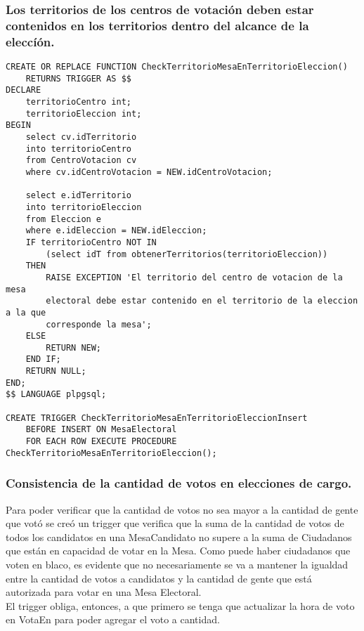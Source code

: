 \subsubsection{Los territorios de los centros de votación deben estar contenidos en los territorios dentro del alcance de la eleccíón.}

\begin{verbatim}
CREATE OR REPLACE FUNCTION CheckTerritorioMesaEnTerritorioEleccion() 
    RETURNS TRIGGER AS $$
DECLARE
    territorioCentro int;
    territorioEleccion int;
BEGIN
    select cv.idTerritorio 
    into territorioCentro 
    from CentroVotacion cv 
    where cv.idCentroVotacion = NEW.idCentroVotacion;
    
    select e.idTerritorio 
    into territorioEleccion 
    from Eleccion e 
    where e.idEleccion = NEW.idEleccion;
    IF territorioCentro NOT IN 
        (select idT from obtenerTerritorios(territorioEleccion))
    THEN
        RAISE EXCEPTION 'El territorio del centro de votacion de la mesa 
        electoral debe estar contenido en el territorio de la eleccion a la que 
        corresponde la mesa';
    ELSE
        RETURN NEW;
    END IF;
    RETURN NULL;
END;
$$ LANGUAGE plpgsql;

CREATE TRIGGER CheckTerritorioMesaEnTerritorioEleccionInsert
    BEFORE INSERT ON MesaElectoral
    FOR EACH ROW EXECUTE PROCEDURE CheckTerritorioMesaEnTerritorioEleccion();
\end{verbatim}

\subsubsection{Consistencia de la cantidad de votos en elecciones de cargo.}

\indent Para poder verificar que la cantidad de votos no sea mayor a la cantidad de gente que votó se creó un trigger que verifica que la suma de la cantidad de votos de todos los candidatos en una MesaCandidato no supere a la suma de Ciudadanos que están en capacidad de votar en la Mesa. Como puede haber ciudadanos que voten en blaco, es evidente que no necesariamente se va a mantener la igualdad entre la cantidad de votos a candidatos y la cantidad de gente que está autorizada para votar en una Mesa Electoral.\\
\indent El trigger obliga, entonces, a que primero se tenga que actualizar la hora de voto en VotaEn para poder agregar el voto a cantidad.\\ 

